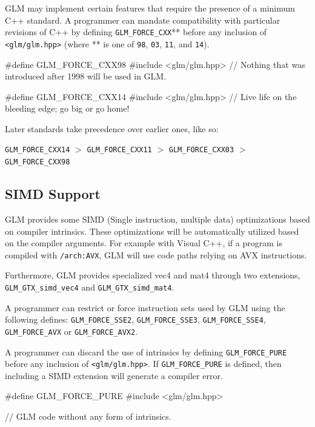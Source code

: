 \documentclass{scrartcl}
\numberwithin{figure}{subsection}
\begin{document}
GLM may implement certain features that require the presence of a minimum C++ standard. A programmer can mandate compatibility with particular revisions of C++ by defining \verb|GLM_FORCE_CXX|** before any inclusion of \verb|<glm/glm.hpp>| (where ** is one of \verb|98|, \verb|03|, \verb|11|, and \verb|14|).

\begin{cppcode}
#define GLM_FORCE_CXX98 
#include <glm/glm.hpp>
// Nothing that was introduced after 1998 will be used in GLM.
\end{cppcode}

\begin{cppcode}
#define GLM_FORCE_CXX14 
#include <glm/glm.hpp>
// Live life on the bleeding edge; go big or go home!
\end{cppcode}

Later standards take precedence over earlier ones, like so:

\verb|GLM_FORCE_CXX14| $>$ \verb|GLM_FORCE_CXX11| $>$ \verb|GLM_FORCE_CXX03| $>$ \verb|GLM_FORCE_CXX98|

\subsection{SIMD Support}

GLM provides some SIMD (Single instruction, multiple data) optimizations based on compiler intrinsics. These optimizations will be automatically utilized based on the compiler arguments. For example with Visual C++, if a program is compiled with \verb|/arch:AVX|, GLM will use code paths relying on AVX instructions.

Furthermore, GLM provides specialized vec4 and mat4 through two extensions, \verb|GLM_GTX_simd_vec4| and \verb|GLM_GTX_simd_mat4|.

A programmer can restrict or force instruction sets used by GLM using the following defines: \verb|GLM_FORCE_SSE2|, \verb|GLM_FORCE_SSE3|, \verb|GLM_FORCE_SSE4|, \verb|GLM_FORCE_AVX| or \verb|GLM_FORCE_AVX2|.

A programmer can discard the use of intrinsics by defining \verb|GLM_FORCE_PURE| before any inclusion of \verb|<glm/glm.hpp>|. If \verb|GLM_FORCE_PURE| is defined, then including a SIMD extension will generate a compiler error.

\begin{cppcode}
#define GLM_FORCE_PURE
#include <glm/glm.hpp>

// GLM code without any form of intrinsics.
\end{cppcode}
\end{document}
